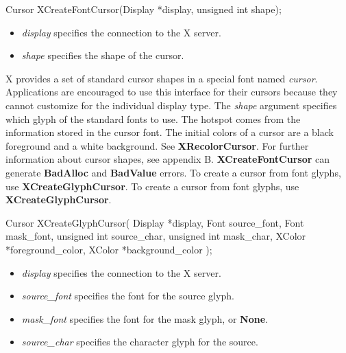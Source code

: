 \documentclass{report}
\begin{document}
\begin{itemize}
\begin{cppcode}
                Cursor XCreateFontCursor(Display *display, unsigned int shape);
            \end{cppcode}
            \bigbreak \noindent
            \begin{itemize}
                \item \textit{display} specifies the connection to the X server.
                \item \textit{shape} specifies the shape of the cursor.
            \end{itemize}
            \bigbreak \noindent
            X provides a set of standard cursor shapes in a special font named \textit{cursor}. Applications are encouraged to use this interface for their cursors because they cannot customize for the individual display type. The \textit{shape} argument specifies which glyph of the standard fonts to use.
            \bigbreak \noindent
            The hotspot comes from the information stored in the cursor font. The initial colors of a cursor are a black foreground and a white background. See \textbf{XRecolorCursor}. For further information about cursor shapes, see appendix B.
            \bigbreak \noindent
            \textbf{XCreateFontCursor} can generate \textbf{BadAlloc} and \textbf{BadValue} errors.
            \bigbreak \noindent
            To create a cursor from font glyphs, use \textbf{XCreateGlyphCursor}.
            \bigbreak \noindent
            To create a cursor from font glyphs, use \textbf{XCreateGlyphCursor}.
            \bigbreak \noindent
            \begin{cppcode}
                Cursor XCreateGlyphCursor(
                    Display *display,
                    Font source_font,
                    Font mask_font,
                    unsigned int source_char,
                    unsigned int mask_char,
                    XColor *foreground_color,
                    XColor *background_color
                );
            \end{cppcode}
            \bigbreak \noindent
            \begin{itemize}
                \item \textit{display} specifies the connection to the X server.
                \item \textit{source\_font} specifies the font for the source glyph.
                \item \textit{mask\_font} specifies the font for the mask glyph, or \textbf{None}.
                \item \textit{source\_char} specifies the character glyph for the source.

\end{itemize}
\end{itemize}
\end{document}
